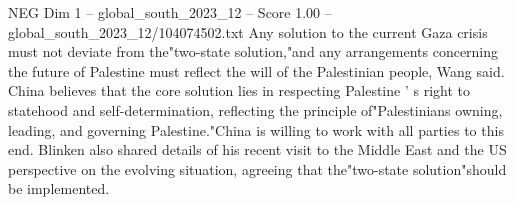 \begin{textsample}{NEG Dim 1 – global\_south\_2023\_12 – Score 1.00 – global\_south\_2023\_12/104074502.txt}
Any solution to the current Gaza crisis must not deviate from the"two-state solution,"and any arrangements concerning the future of Palestine must reflect the will of the Palestinian people, Wang said.
China believes that the core solution lies in respecting Palestine ' s right to statehood and self-determination, reflecting the principle of"Palestinians owning, leading, and governing Palestine."China is willing to work with all parties to this end.
Blinken also shared details of his recent visit to the Middle East and the US perspective on the evolving situation, agreeing that the"two-state solution"should be implemented.

\end{textsample}

